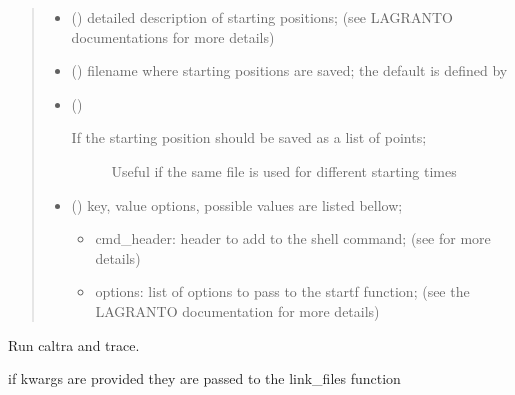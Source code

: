 \documentclass[a4paper,10pt,english]{sphinxmanual}
\begin{document}
\begin{fulllineitems}
\begin{fulllineitems}
\begin{quote}
\begin{description}
\begin{itemize}
\item {} 
 () \textendash{} detailed description of starting positions;
(see LAGRANTO documentations for more details)

\item {} 
 () \textendash{} filename where starting positions are saved;
the default is defined by 

\item {} 
 () \textendash{} \begin{description}
\item[{If the starting position should be saved as a list of points;}] \leavevmode
Useful if the same file is used for different starting times

\end{description}


\item {} 
 () \textendash{} 
key, value options, possible values are listed bellow;
\begin{itemize}
\item {} 
cmd\_header:
header to add to the shell command;
(see  for more details)

\item {} 
options:
list of options to pass to the startf function;
(see the LAGRANTO documentation for more details)

\end{itemize}


\end{itemize}

\end{description}\end{quote}

\end{fulllineitems}


\begin{fulllineitems}
\label{\detokenize{lagranto:lagranto.LagrantoRun.run}}
Run caltra and trace.

if kwargs are provided they are passed to the link\_files function


\end{fulllineitems}
\end{fulllineitems}
\end{document}
